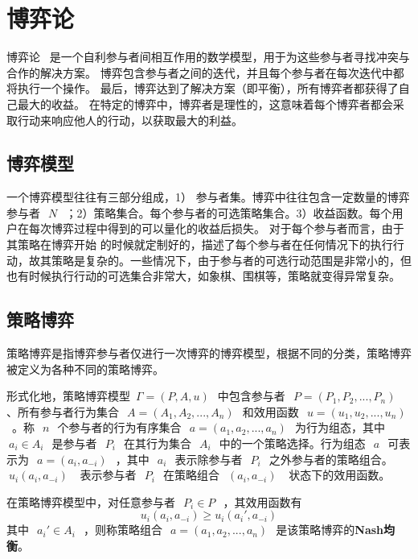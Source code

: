 
\section{博弈论}
博弈论~\cite{owen2001game,gibbons1992game} 是一个自利参与者间相互作用的数学模型，用于为这些参与者寻找冲突与合作的解决方案。 博弈包含参与者之间的迭代，并且每个参与者在每次迭代中都将执行一个操作。 最后，博弈达到了解决方案（即平衡），所有博弈者都获得了自己最大的收益。 在特定的博弈中，博弈者是理性的，这意味着每个博弈者都会采取行动来响应他人的行动，以获取最大的利益。


\subsection{博弈模型}

一个博弈模型往往有三部分组成，1） 参与者集。博弈中往往包含一定数量的博弈参与者~$~N~$~；2）策略集合。每个参与者的可选策略集合。3）收益函数。每个用户在每次博弈过程中得到的可以量化的收益后损失。
对于每个参与者而言，由于其策略在博弈开始 的时候就定制好的，描述了每个参与者在任何情况下的执行行动，故其策略是复杂的。一些情况下，由于参与者的可选行动范围是非常小的，但也有时候执行行动的可选集合非常大，如象棋、围棋等，策略就变得异常复杂。

\subsection{策略博弈}
策略博弈是指博弈参与者仅进行一次博弈的博弈模型，根据不同的分类，策略博弈被定义为各种不同的策略博弈。

形式化地，策略博弈模型~$\Gamma=(P,A,u)~$~中包含参与者~$~P=(P_1,P_2,...,P_n)~$~   、所有参与者行为集合~$~A=(A_1,A_2,...,A_n)~$~和效用函数~$~u=(u_1,u_2,...,u_n)~$~。称~$~n~$~个参与者的行为有序集合~$~a=(a_1,a_2,...,a_n)~$~为行为组态，其中~$~a_i \in A_i~$~是参与者~$~P_i~$~在其行为集合~$~A_i~$~中的一个策略选择。行为组态~$~a~$~可表示为~$~a=(a_i,a_{-i})~$~，其中~$~a_i~$~表示除参与者~$~P_i~$~之外参与者的策略组合。~$~u_i(a_i,a_{-i})~$~ 表示参与者~$~P_i~$~在策略组合~$~(a_i,a_{-i})~$~ 状态下的效用函数。

\begin{definition}
	在策略博弈模型中，对任意参与者~$~P_i \in P~$~，其效用函数有
	\begin{equation}
	u_i(a_i,a_{-i}) \geq 	u_i(a_i',a_{-i})
	\end{equation}
	其中~$~a_i'\in A_i~$~，则称策略组合~$~a=(a_1,a_2,...,a_n)~$~是该策略博弈的\textbf{Nash均衡}。
\end{definition}


